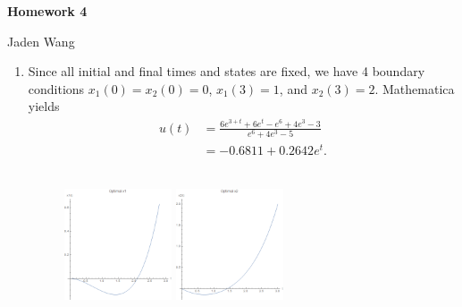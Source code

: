 \documentclass[12pt]{article}
\begin{document}
\centerline {\textsf{\textbf{\LARGE{Homework 4}}}}
\centerline {Jaden Wang}
\vspace{.15in}
\begin{problem}[1]
\begin{enumerate}[label=(\alph*)]
The Hamiltonian of the problem is given by
\begin{align*}
	H(x_1,x_2,u,p_1,p_2) = \frac{1}{2} u ^2+ p_1x_2+p_2(u-x_2). 
\end{align*}
The adjoint equations are given by
\begin{align*}
	\dot{p_1} &= -H_{x_1} = 0 \\
	\dot{p_2} &= -H_{x_2} = p_2-p_1 .
\end{align*}
The first-order condition demands
\begin{align*}
	H_u = u+p_2 &= 0\\
	u&= -p_2 .
\end{align*}
Plugging this into the differential equations yield
\begin{align*}
	\dot{x_1} &= x_2 \\
	\dot{x_2} &= -x_2-p_2 .
\end{align*}
Together with the adjoint equations, we have 4 first-order equations and require 4 boundary conditions.
\item Since all initial and final times and states are fixed, we have 4 boundary conditions $ x_1(0)=x_2(0)=0$, $ x_1(3)=1$, and $ x_2(3)=2$. Mathematica yields
\begin{align*}
	u(t) &= \frac{6e^{3+t}+6e^{t}-e^{6}+4e^{3}-3}{e^{6}+4e^{3}-5}\\
	&=-0.6811 + 0.2642 e^{t}.
\end{align*}
~\begin{figure}[H]
	\centering
	\includegraphics[width=0.3\textwidth]{./figures/4.1.png}
	\includegraphics[width=0.3\textwidth]{./figures/4.2.png}

\end{figure}
\end{enumerate}
\end{problem}
\end{document}
